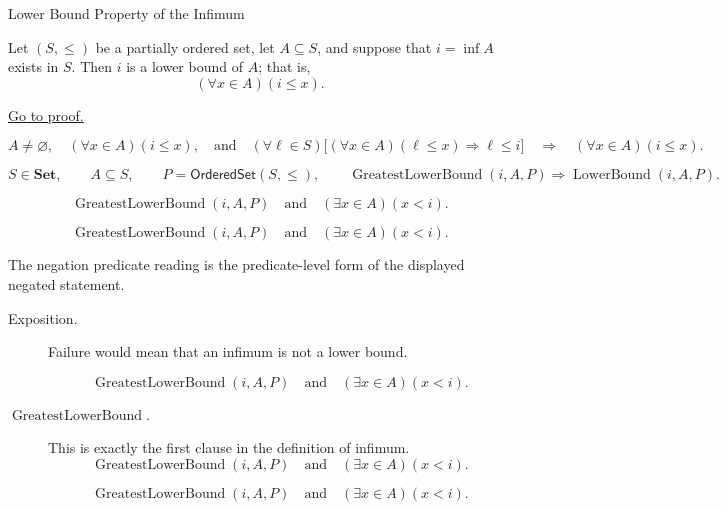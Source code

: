 \begin{propositionbox}{Lower Bound Property of the Infimum}
\begin{proposition}
\label{prop:lower-bound-property-of-infimum}
Let $(S,\leq)$ be a partially ordered set, let $A\subseteq S$, and suppose
that $i=\inf A$ exists in $S$. Then $i$ is a lower bound of $A$; that is,
\[
  (\forall x\in A)(i\leq x).
\]

\hyperref[prf:lower-bound-property-of-infimum]{Go to proof.}
\end{proposition}
\end{propositionbox}

\begin{remark*}
\[
  A\neq\varnothing,
  \quad (\forall x\in A)(i\leq x),
  \quad\text{and}\quad
  (\forall \ell\in S)\bigl[(\forall x\in A)(\ell\leq x)\Rightarrow \ell\leq i\bigr]
  \quad\Longrightarrow\quad
  (\forall x\in A)(i\leq x).
\]
\end{remark*}

\begin{remark*}
\[
  S\in\mathbf{Set},\qquad A\subseteq S,\qquad P=\mathsf{OrderedSet}(S,\leq),\qquad
  \operatorname{GreatestLowerBound}(i,A,P)\Longrightarrow
  \operatorname{LowerBound}(i,A,P).
\]
\end{remark*}

\begin{remark*}
\[
  \operatorname{GreatestLowerBound}(i,A,P)
  \quad\text{and}\quad
  (\exists x\in A)(x<i).
\]
\end{remark*}

\begin{remark*}
\[
  \operatorname{GreatestLowerBound}(i,A,P)
  \quad\text{and}\quad
  (\exists x\in A)(x<i).
\]

The negation predicate reading is the predicate-level form of the displayed negated statement.
\end{remark*}

\begin{remark*}
\begin{description}
  \item[Exposition.]
  Failure would mean that an infimum is not a lower bound.

  
\[
\operatorname{GreatestLowerBound}(i,A,P)
  \quad\text{and}\quad
  (\exists x\in A)(x<i).
\]
  \item[\(\operatorname{GreatestLowerBound}.\)]
  This is exactly the first clause in the definition of infimum.
  \[
    \operatorname{GreatestLowerBound}(i,A,P)
    \quad\text{and}\quad
    (\exists x\in A)(x<i).
  \]

\[
    \operatorname{GreatestLowerBound}(i,A,P)
    \quad\text{and}\quad
    (\exists x\in A)(x<i).
  \]
\end{description}
\end{remark*}

